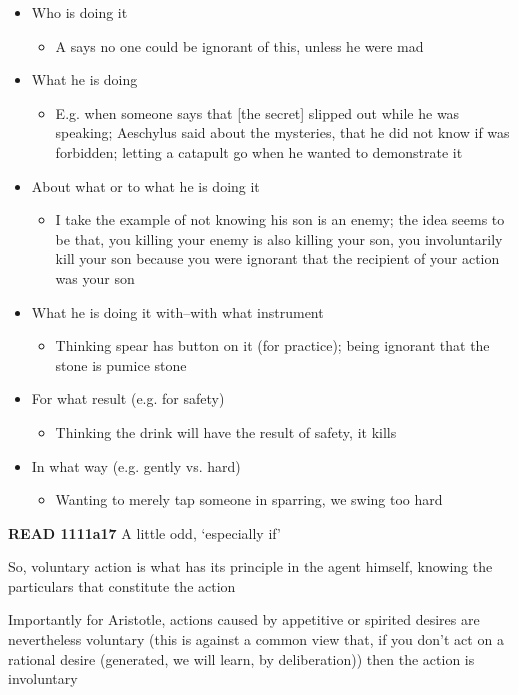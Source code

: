 \documentclass[11pt]{article}
\begin{document}
\begin{itemize}\item{Who is doing it}\begin{itemize}\item{A says no one could be ignorant of this, unless he were mad}\end{itemize}\item{What he is doing}\begin{itemize}\item{E.g. when someone says that [the secret] slipped out while he was speaking; Aeschylus said about the mysteries, that he did not know if was forbidden; letting a catapult go when he wanted to demonstrate it}\end{itemize}\item{About what or to what he is doing it}\begin{itemize}\item{I take the example of not knowing his son is an enemy; the idea seems to be that, you killing your enemy is also killing your son, you involuntarily kill your son because you were ignorant that the recipient of your action was your son}\end{itemize}\item{What he is doing it with--with what instrument}\begin{itemize}\item{Thinking spear has button on it (for practice); being ignorant that the stone is pumice stone}\end{itemize}\item{For what result (e.g. for safety)}\begin{itemize}\item{Thinking the drink will have the result of safety, it kills}\end{itemize}\item{In what way (e.g. gently vs. hard)}\begin{itemize}\item{Wanting to merely tap someone in sparring, we swing too hard}\end{itemize}\end{itemize}

\noindent\textbf{READ 1111a17} A little odd, `especially if'
\vspace*{2mm}

\noindent So, voluntary action is what has its principle in the agent himself, knowing the particulars that constitute the action
\vspace*{2mm}

\noindent Importantly for Aristotle, actions caused by appetitive or spirited desires are nevertheless voluntary (this is against a common view that, if you don't act on a rational desire (generated, we will learn, by deliberation)) then the action is involuntary
\end{document}
